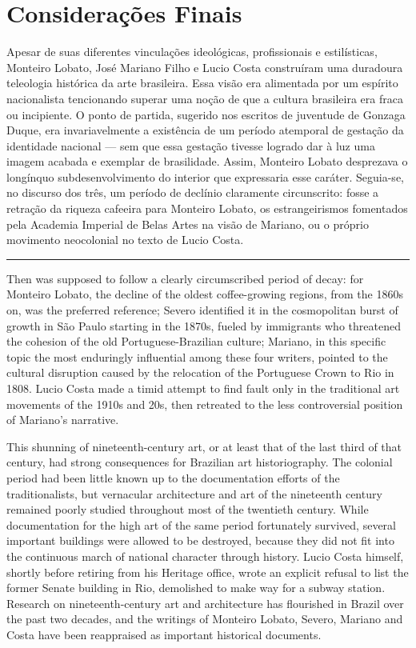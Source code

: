 \hypertarget{considerauxe7uxf5es-finais}{%
\section{Considerações Finais}\label{considerauxe7uxf5es-finais}}

Apesar de suas diferentes vinculações ideológicas, profissionais e
estilísticas, Monteiro Lobato, José Mariano Filho e Lucio Costa
construíram uma duradoura teleologia histórica da arte brasileira. Essa
visão era alimentada por um espírito nacionalista tencionando superar
uma noção de que a cultura brasileira era fraca ou incipiente. O ponto
de partida, sugerido nos escritos de juventude de Gonzaga Duque, era
invariavelmente a existência de um período atemporal de gestação da
identidade nacional --- sem que essa gestação tivesse logrado dar à luz
uma imagem acabada e exemplar de brasilidade. Assim, Monteiro Lobato
desprezava o longínquo subdesenvolvimento do interior que expressaria
esse caráter. Seguia-se, no discurso dos três, um período de declínio
claramente circunscrito: fosse a retração da riqueza cafeeira para
Monteiro Lobato, os estrangeirismos fomentados pela Academia Imperial de
Belas Artes na visão de Mariano, ou o próprio movimento neocolonial no
texto de Lucio Costa.

\begin{center}\rule{0.5\linewidth}{0.5pt}\end{center}

Then was supposed to follow a clearly circumscribed period of decay: for
Monteiro Lobato, the decline of the oldest coffee-growing regions, from
the 1860s on, was the preferred reference; Severo identified it in the
cosmopolitan burst of growth in São Paulo starting in the 1870s, fueled
by immigrants who threatened the cohesion of the old
Portuguese-Brazilian culture; Mariano, in this specific topic the most
enduringly influential among these four writers, pointed to the cultural
disruption caused by the relocation of the Portuguese Crown to Rio in
1808. Lucio Costa made a timid attempt to find fault only in the
traditional art movements of the 1910s and 20s, then retreated to the
less controversial position of Mariano's narrative.

This shunning of nineteenth-century art, or at least that of the last
third of that century, had strong consequences for Brazilian art
historiography. The colonial period had been little known up to the
documentation efforts of the traditionalists, but vernacular
architecture and art of the nineteenth century remained poorly studied
throughout most of the twentieth century. While documentation for the
high art of the same period fortunately survived, several important
buildings were allowed to be destroyed, because they did not fit into
the continuous march of national character through history. Lucio Costa
himself, shortly before retiring from his Heritage office, wrote an
explicit refusal to list the former Senate building in Rio, demolished
to make way for a subway station. Research on nineteenth-century art and
architecture has flourished in Brazil over the past two decades, and the
writings of Monteiro Lobato, Severo, Mariano and Costa have been
reappraised as important historical documents.

